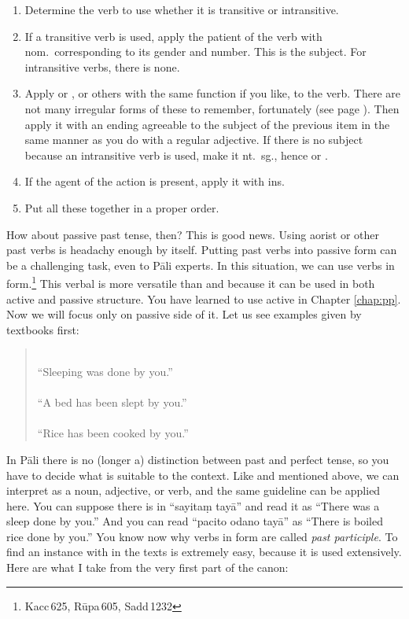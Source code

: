 \begin{enumerate}
\item Determine the verb to use whether it is transitive or intransitive.
\item If a transitive verb is used, apply the patient of the verb with nom.\ corresponding to its gender and number. This is the subject. For intransitive verbs, there is none.
\item Apply  or , or others with the same function if you like, to the verb. There are not many irregular forms of these to remember, fortunately (see page \pageref{sec:irrprod}). Then apply it with an ending agreeable to the subject of the previous item in the same manner as you do with a regular adjective. If there is no subject because an intransitive verb is used, make it nt.\ sg., hence  or .
\item If the agent of the action is present, apply it with ins.
\item Put all these together in a proper order.
\end{enumerate}

How about passive past tense, then? This is good news. Using aorist or other past verbs is headachy enough by itself. Putting past verbs into passive form can be a challenging task, even to P\=ali experts. In this situation, we can use verbs in  form.\footnote{Kacc\,625, R\=upa\,605, Sadd\,1232} This verbal  is more versatile than  and  because it can be used in both active and passive structure. You have learned to use active  in Chapter \ref{chap:pp}. Now we will focus only on passive side of it. Let us see examples given by textbooks first:

\begin{quote}
\\
``Sleeping was done by you.''\\
\\
``A bed has been slept by you.''\\
\\
``Rice has been cooked by you.''\\
\end{quote}

In P\=ali there is no (longer a) distinction between past and perfect tense, so you have to decide what is suitable to the context. Like  and  mentioned above, we can interpret  as a noun, adjective, or verb, and the same guideline can be applied here. You can suppose there is  in ``sayita\d m tay\=a'' and read it as ``There was a sleep done by you.'' And you can read ``pacito odano tay\=a'' as ``There is boiled rice done by you.'' You know now why verbs in  form are called \emph{past participle}. To find an instance with  in the texts is extremely easy, because it is used extensively. Here are what I take from the very first part of the canon:

